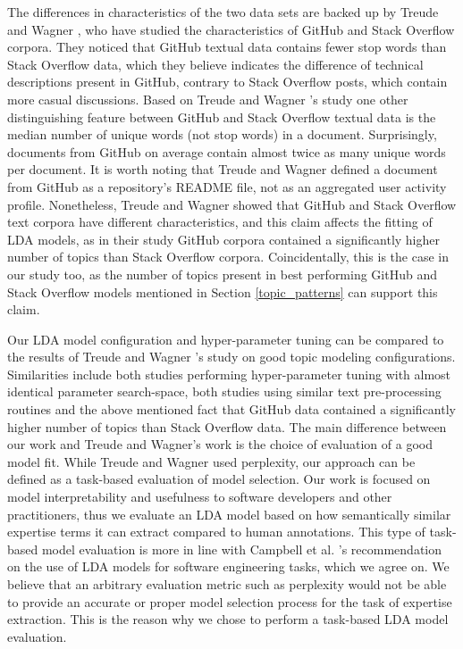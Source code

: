         The differences in characteristics of the two data sets are backed up by Treude and Wagner \cite{treude2019predicting}, who have studied the characteristics of GitHub and Stack Overflow corpora. They noticed that GitHub textual data contains fewer stop words than Stack Overflow data, which they believe indicates the difference of technical descriptions present in GitHub, contrary to Stack Overflow posts, which contain more casual discussions. Based on Treude and Wagner \cite{treude2019predicting}'s study one other distinguishing feature between GitHub and Stack Overflow textual data is the median number of unique words (not stop words) in a document. Surprisingly, documents from GitHub on average contain almost twice as many unique words per document. It is worth noting that Treude and Wagner defined a document from GitHub as a repository's README file, not as an aggregated user activity profile. Nonetheless, Treude and Wagner showed that GitHub and Stack Overflow text corpora have different characteristics, and this claim affects the fitting of LDA models, as in their study GitHub corpora contained a significantly higher number of topics than Stack Overflow corpora. Coincidentally, this is the case in our study too, as the number of topics present in best performing GitHub and Stack Overflow models mentioned in Section \ref{topic_patterns} can support this claim.
    
        Our LDA model configuration and hyper-parameter tuning can be compared to the results of Treude and Wagner \cite{treude2019predicting}'s study on good topic modeling configurations. Similarities include both studies performing hyper-parameter tuning with almost identical parameter search-space, both studies using similar text pre-processing routines and the above mentioned fact that GitHub data contained a significantly higher number of topics than Stack Overflow data. The main difference between our work and Treude and Wagner's work is the choice of evaluation of a good model fit. While Treude and Wagner used perplexity, our approach can be defined as a task-based evaluation of model selection. Our work is focused on model interpretability and usefulness to software developers and other practitioners, thus we evaluate an LDA model based on how semantically similar expertise terms it can extract compared to human annotations. This type of task-based model evaluation is more in line with Campbell et al. \cite{campbell2015latent}'s recommendation on the use of LDA models for software engineering tasks, which we agree on. We believe that an arbitrary evaluation metric such as perplexity would not be able to provide an accurate or proper model selection process for the task of expertise extraction. This is the reason why we chose to perform a task-based LDA model evaluation.

